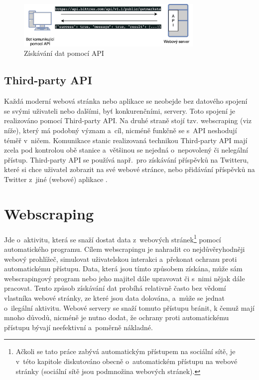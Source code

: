 \begin{figure}[hbt]
	\centering
	\includegraphics[width=0.8\textwidth]{images/API.jpg}
	\caption{Získávání dat pomocí API}
	\label{img:api}
\end{figure}

\subsection*{Third-party API}
Každá moderní webová stránka nebo aplikace se neobejde bez datového spojení se svými uživateli nebo dalšími, byť konkurenčními, servery. Toto spojení je realizováno pomocí Third-party API. Na druhé straně stojí tzv. webscraping (viz níže), který má podobný význam a~cíl, nicméně funkčně se s~API neshodují téměř v~ničem. Komunikace stanic realizovaná technikou Third-party API mají zcela pod kontrolou obě stanice a~většinou se nejedná o~nepovolený či nelegální přístup. Third-party API se používá např.~pro získávání příspěvků na Twitteru, které si chce uživatel zobrazit na své webové stránce, nebo přidávání příspěvků na Twitter z~jiné (webové) aplikace \cite{bib:third_party_API}. 

\section{Webscraping}
\label{sec:webscraping}
Jde o~aktivitu, která se snaží dostat data z~webových stránek\footnote{Ačkoli se tato práce zabývá automatickým přístupem na sociální sítě, je v~této kapitole diskutováno obecně o~automatickém přístupu na webové stránky (sociální sítě jsou podmnožina webových stránek).} pomocí automatického programu. Cílem webscrapingu je nahradit co nejdůvěryhodněji webový prohlížeč, simulovat uživatelskou interakci a~překonat ochranu proti automatickému přístupu. Data, která jsou tímto způsobem získána, může sám webscrapingový program nebo jeho majitel dále upravovat či s~nimi nějak dále pracovat. Tento způsob získávání dat probíhá relativně často bez vědomí vlastníka webové stránky, ze které jsou data dolována, a~může se jednat o~ilegální aktivitu. Webové servery se snaží tomuto přístupu bránit, k čemuž mají mnoho důvodů, nicméně je nutno dodat, že ochrany proti automatickému přístupu bývají neefektivní a~poměrně nákladné.

